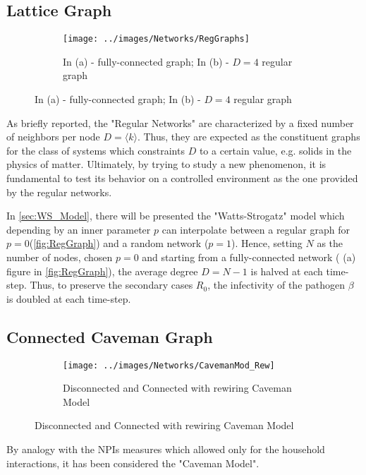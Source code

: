 \documentclass[a4paper,10pt,twoside]{book} %
\theoremstyle{definition}
\begin{document}
\subsection{Lattice Graph}
\begin{figure}[ht]
    \begin{subfigure}{\textwidth}
        \texttt{[image: ../images/Networks/RegGraphs]}
        \centering
        \caption{In (a) - fully-connected graph; In (b) - $D = 4$ regular graph \cite{Zelazo:2011_RSensNet_images}}
        \label{fig:RegGraph}
    \end{subfigure}
\end{figure}

As briefly reported, the "Regular Networks" are characterized by a fixed number of neighbors per node $D = \langle k \rangle$. Thus, they are expected as the constituent graphs for the class of systems which constraints $D$ to a certain value, e.g. solids in the physics of matter.
Ultimately, by trying to study a new phenomenon, it is fundamental to test its behavior on a controlled environment as the one provided by the regular networks.

In \autoref{sec:WS_Model}, there will be presented the "Watts-Strogatz" model which depending by an inner parameter $p$ can interpolate between a regular graph for $p = 0$(\autoref{fig:RegGraph}) and a random network ($p=1$).
Hence, setting $N$ as the number of nodes, chosen $p=0$ and starting from a fully-connected network ( (a) figure in \autoref{fig:RegGraph}), the average degree $D = N-1$ is halved at each time-step. Thus, to preserve the secondary cases $R_0$, the infectivity of the pathogen $\beta$ is doubled at each time-step.

\subsection{Connected Caveman Graph}
\begin{figure}[ht]
    \begin{subfigure}{\textwidth}
        \texttt{[image: ../images/Networks/CavemanMod\_Rew]}
        \centering
        \caption{Disconnected and Connected with rewiring Caveman Model \cite{Taube:2005_IndianSoftwIndustry}}
        \label{fig:CavemanMod}
    \end{subfigure}
\end{figure}


By analogy with the NPIs measures which allowed only for the household interactions, it has been considered the "Caveman Model".
\end{document}
